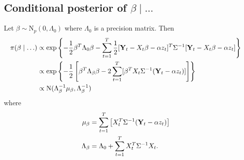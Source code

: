 \subsection*{Conditional posterior of $\beta \mid \ldots$}\label{s:betapost}
Let $\beta \sim \mbox{N}_{p}(0, \Lambda_0)$ where $\Lambda_0$ is a precision matrix. Then 
\begin{align*}
    \pi(\beta \mid \ldots) & \propto \exp \left\{ - \frac{ 1 }{ 2 } \beta^T \Lambda_0 \beta - \sum_{t = 1 }^T \frac{ 1 }{ 2 } [\mbox{\bf Y}_t - X_t \beta - \alpha z_t]^T \Sigma^{-1} [\mbox{\bf Y}_t - X_t \beta - \alpha z_t] \right\}\\
     & \propto \exp \left\{ -\frac{ 1 }{ 2 } \left[ \beta^T \Lambda_\beta \beta  - 2 \sum_{ t = 1 }^T [ \beta^T X_t \Sigma^{-1} (\mbox{\bf Y}_t - \alpha z_t )] \right] \right\}\\
     & \propto \mbox{N} ( \Lambda_\beta^{-1} \mu_\beta , \Lambda_\beta^{-1})
\end{align*}
where
\begin{align*}
    \mu_\beta &= \sum_{t=1}^{T} \left[ X_t^T \Sigma^{-1} (\mbox{\bf Y}_t - \alpha z_t) \right]\\
    \Lambda_\beta &= \Lambda_0 + \sum_{ t = 1 }^{ T} X_t^T \Sigma^{-1} X_t. 
\end{align*}
